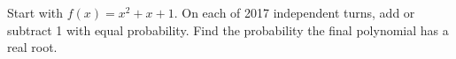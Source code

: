 Start with $ f(x)=x^2+x+1 $. On each of 2017 independent turns, add or subtract 1 with equal probability. Find the probability the final polynomial has a real root.
